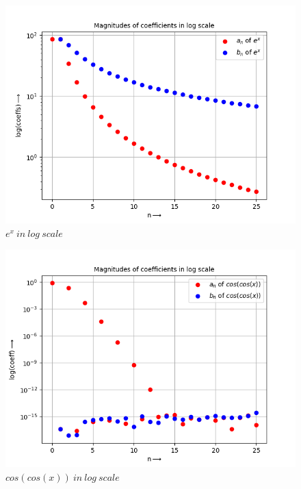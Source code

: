\documentclass[11pt, a4paper]{article}
\begin{document}
\begin{figure}[!tbh]
    \centering
    \includegraphics[scale = 0.7]{Q3-1.png}
    \caption{$e^x\ in\ log\ scale$}
    \label{fig:Figure 3}
\end{figure}

\begin{figure}[!tbh]
    \centering
    \includegraphics[scale = 0.7]{Q3-2.png}
    \caption{$cos(cos(x))\ in\ log\ scale$}
    \label{fig:Figure 4}
\end{figure}
\end{document}
